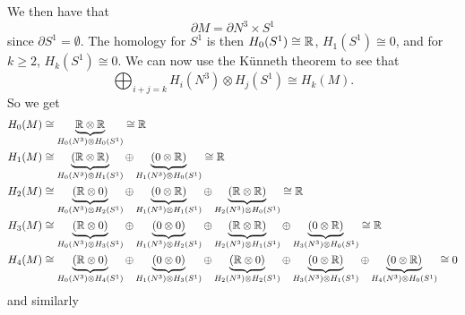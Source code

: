 \documentclass{article}
\begin{document}
We then have that 
\begin{equation}
    \partial M = \partial N^3 \times S^1
\end{equation}
since $\partial S^1 = \emptyset$. The homology for $S^1$ is then $H_0(S^1)\cong \mathbb{R}$, $H_1(S^1)\cong 0$, and for $k\geq 2$, $H_k(S^1)\cong 0$. We can now use the K\"unneth theorem to see that
\begin{equation}
    \bigoplus_{i+j=k} H_i(N^3)\otimes H_j(S^1) \cong H_k(M).
\end{equation}
So we get
\begin{align*}
    H_0(M) &\cong \underbrace{\mathbb{R} \otimes \mathbb{R}}_{H_0(N^3)\otimes H_0(S^1)} \cong \mathbb{R}\\
    H_1(M) &\cong \underbrace{(\mathbb{R} \otimes \mathbb{R})}_{H_0(N^3)\otimes H_1(S^1)} \oplus \underbrace{(0 \otimes \mathbb{R})}_{H_1(N^3)\otimes H_0(S^1)} \cong \mathbb{R}\\
    H_2(M) &\cong \underbrace{(\mathbb{R} \otimes 0)}_{H_0(N^3)\otimes H_2(S^1)} \oplus \underbrace{(0 \otimes \mathbb{R})}_{H_1(N^3)\otimes H_1(S^1)} \oplus \underbrace{(\mathbb{R} \otimes \mathbb{R})}_{H_2(N^3)\otimes H_0(S^1)} \cong \mathbb{R}\\
    H_3(M) &\cong \underbrace{(\mathbb{R} \otimes 0)}_{H_0(N^3)\otimes H_3(S^1)} \oplus \underbrace{(0 \otimes 0)}_{H_1(N^3)\otimes H_2(S^1)} \oplus \underbrace{(\mathbb{R} \otimes \mathbb{R})}_{H_2(N^3)\otimes H_1(S^1)} \oplus \underbrace{(0 \otimes \mathbb{R})}_{H_3(N^3)\otimes H_0(S^1)} \cong \mathbb{R}\\
    H_4(M) &\cong \underbrace{(\mathbb{R} \otimes 0)}_{H_0(N^3)\otimes H_4(S^1)} \oplus \underbrace{(0 \otimes 0)}_{H_1(N^3)\otimes H_3(S^1)} \oplus \underbrace{(\mathbb{R} \otimes 0)}_{H_2(N^3)\otimes H_2(S^1)} \oplus \underbrace{(0 \otimes \mathbb{R})}_{H_3(N^3)\otimes H_1(S^1)} \oplus \underbrace{(0 \otimes \mathbb{R})}_{H_4(N^3)\otimes H_0(S^1)} \cong 0
\end{align*}
and similarly 
\end{document}
